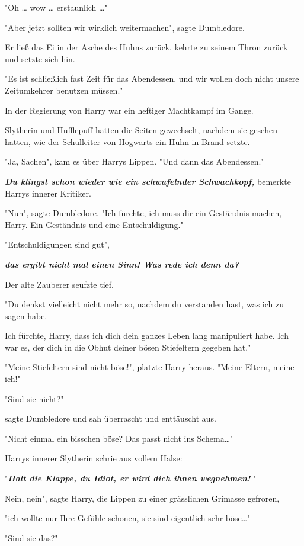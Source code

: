 {"Oh … wow … erstaunlich …"

"Aber jetzt sollten wir wirklich weitermachen", sagte Dumbledore.

Er ließ das Ei in der Asche des Huhns zurück, kehrte zu seinem Thron zurück und setzte sich hin.

"Es ist schließlich fast Zeit für das Abendessen, und wir wollen doch nicht unsere Zeitumkehrer benutzen müssen."

In der Regierung von Harry war ein heftiger Machtkampf im Gange.

Slytherin und Hufflepuff hatten die Seiten gewechselt, nachdem sie gesehen hatten, wie der Schulleiter von Hogwarts ein Huhn in Brand setzte.

"Ja, Sachen", kam es über Harrys Lippen. "Und dann das Abendessen."

\textbf{\emph{Du klingst schon wieder wie ein schwafelnder Schwachkopf,}} bemerkte Harrys innerer Kritiker.

"Nun", sagte Dumbledore. "Ich fürchte, ich muss dir ein Geständnis machen, Harry. Ein Geständnis und eine Entschuldigung."

"Entschuldigungen sind gut",

\textbf{\emph{das ergibt nicht mal einen Sinn! Was rede ich denn da?}}

Der alte Zauberer seufzte tief.

"Du denkst vielleicht nicht mehr so, nachdem du verstanden hast, was ich zu sagen habe.

Ich fürchte, Harry, dass ich dich dein ganzes Leben lang manipuliert habe. Ich war es, der dich in die Obhut deiner bösen Stiefeltern gegeben hat."

"Meine Stiefeltern sind nicht böse!", platzte Harry heraus. "Meine Eltern, meine ich!"

"Sind sie nicht?"

sagte Dumbledore und sah überrascht und enttäuscht aus.

"Nicht einmal ein bisschen böse? Das passt nicht ins Schema…"

Harrys innerer Slytherin schrie aus vollem Halse:

"\textbf{\emph{Halt die Klappe, du Idiot, er wird dich ihnen wegnehmen!}} "

Nein, nein", sagte Harry, die Lippen zu einer grässlichen Grimasse gefroren,

"ich wollte nur Ihre Gefühle schonen, sie sind eigentlich sehr böse…"

"Sind sie das?"

}
